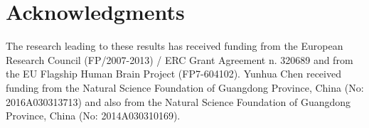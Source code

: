 \documentclass[10pt,journal,compsoc]{IEEEtran}
\begin{document}
	\section*{Acknowledgments}
The research leading to these results has received funding from the European Research Council 
(FP/2007-2013) / ERC Grant Agreement n. 320689 and from the EU Flagship Human Brain Project (FP7-604102). 
Yunhua Chen received funding from the Natural Science Foundation of Guangdong Province, China (No: 2016A030313713) and also from  the Natural Science Foundation of Guangdong Province, China (No: 2014A030310169).





%



\end{document}
